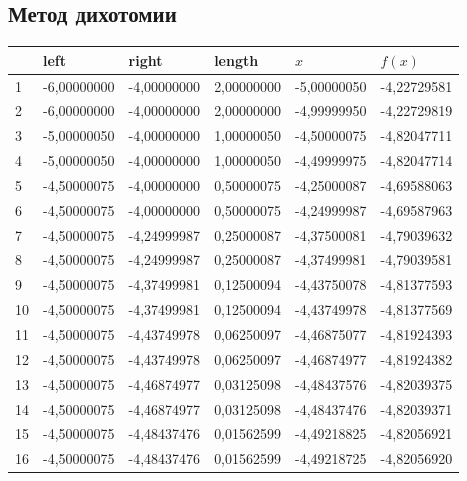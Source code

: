 \subsection{Метод дихотомии}\label{subsec:метод-дихотомии}
\begin{center}
    \begin{tabular}{ | l | l | l | l | l | l |}
        \hline
        \textnumero{} & left        & right       & length     & $x$         & $f(x)$      \\ \hline
        1             & -6,00000000 & -4,00000000 & 2,00000000 & -5,00000050 & -4,22729581 \\
        2             & -6,00000000 & -4,00000000 & 2,00000000 & -4,99999950 & -4,22729819 \\
        3             & -5,00000050 & -4,00000000 & 1,00000050 & -4,50000075 & -4,82047711 \\
        4             & -5,00000050 & -4,00000000 & 1,00000050 & -4,49999975 & -4,82047714 \\
        5             & -4,50000075 & -4,00000000 & 0,50000075 & -4,25000087 & -4,69588063 \\
        6             & -4,50000075 & -4,00000000 & 0,50000075 & -4,24999987 & -4,69587963 \\
        7             & -4,50000075 & -4,24999987 & 0,25000087 & -4,37500081 & -4,79039632 \\
        8             & -4,50000075 & -4,24999987 & 0,25000087 & -4,37499981 & -4,79039581 \\
        9             & -4,50000075 & -4,37499981 & 0,12500094 & -4,43750078 & -4,81377593 \\
        10            & -4,50000075 & -4,37499981 & 0,12500094 & -4,43749978 & -4,81377569 \\
        11            & -4,50000075 & -4,43749978 & 0,06250097 & -4,46875077 & -4,81924393 \\
        12            & -4,50000075 & -4,43749978 & 0,06250097 & -4,46874977 & -4,81924382 \\
        13            & -4,50000075 & -4,46874977 & 0,03125098 & -4,48437576 & -4,82039375 \\
        14            & -4,50000075 & -4,46874977 & 0,03125098 & -4,48437476 & -4,82039371 \\
        15            & -4,50000075 & -4,48437476 & 0,01562599 & -4,49218825 & -4,82056921 \\
        16            & -4,50000075 & -4,48437476 & 0,01562599 & -4,49218725 & -4,82056920 \\

\end{tabular}
\end{center}
